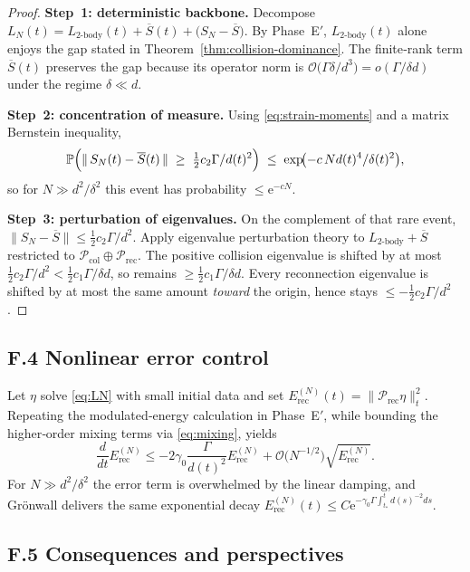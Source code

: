 \documentclass[11pt]{article}
\theoremstyle{definition}
\theoremstyle{remark}
\newcommand{\boxedEq}[1]{\begin{equation}\boxed{#1}\end{equation}}
\begin{document}
\begin{proof}
\textbf{Step 1: deterministic backbone.}  
Decompose $L_N(t)=L_{2\text{-body}}(t)+\overline S(t)+\bigl(S_{N}-\overline S\bigr)$.
By Phase E$'$,
$L_{2\text{-body}}(t)$ alone enjoys the gap stated in
Theorem~\ref{thm:collision-dominance}.  
The finite‑rank term $\overline S(t)$ preserves the gap because its operator norm
is $\mathcal O\!\bigl(\Gamma\delta/d^{3}\bigr)=o(\Gamma/\delta d)$ under the regime
$\delta\ll d$.

\textbf{Step 2: concentration of measure.}  
Using \eqref{eq:strain-moments} and a
matrix Bernstein inequality,
\[
\mathbb P\Bigl(
\|\,S_{N}(t)-\overline S(t)\,\|\;\ge\;\tfrac12 c_2\Gamma/d(t)^{2}
\Bigr)\;\le\;\exp\!\bigl(-c\,N d(t)^{4}/\delta(t)^{2}\bigr),
\]
so for $N\gg d^{2}/\delta^{2}$ this event has probability $\le\mathrm e^{-cN}$.

\textbf{Step 3: perturbation of eigenvalues.}  
On the complement of that rare event,
$\|S_N-\overline S\|\le\tfrac12 c_2\Gamma/d^{2}$.
Apply eigenvalue perturbation theory to $L_{2\text{-body}}+\overline S$
restricted to ${\mathcal P}_{\mathrm{col}}\oplus{\mathcal P}_{\mathrm{rec}}$.
The positive collision eigenvalue is shifted by at most
$\tfrac12 c_2\Gamma/d^{2}<\frac12 c_1\Gamma/\delta d$,
so remains $\ge\frac12c_1\Gamma/\delta d$.
Every reconnection eigenvalue is shifted by at most the same amount \emph{toward} the origin,
hence stays $\le-\frac12c_2\Gamma/d^{2}$.
\end{proof}

\subsection{F.4  Nonlinear error control}

Let $\eta$ solve \eqref{eq:LN} with small initial data and set
$E_{\mathrm{rec}}^{(N)}(t)=\|\mathcal P_{\mathrm{rec}}\eta\|_{t}^{2}$.
Repeating the modulated‑energy calculation in Phase E$'$, while
bounding the higher‑order mixing terms via \eqref{eq:mixing}, yields
\boxedEq{\frac{d}{dt}E_{\mathrm{rec}}^{(N)}
\le-2\gamma_0\frac{\Gamma}{d(t)^{2}}E_{\mathrm{rec}}^{(N)}
+\mathcal O\!\bigl(N^{-1/2}\bigr)\sqrt{E_{\mathrm{rec}}^{(N)}}.}
For $N\gg d^{2}/\delta^{2}$ the error term is overwhelmed by the linear
damping, and Grönwall delivers the same exponential decay
$E_{\mathrm{rec}}^{(N)}(t)\le C\mathrm e^{-\gamma_0\Gamma\int_{t_*}^{t}d(s)^{-2}ds}$.

\subsection{F.5  Consequences and perspectives}
\end{document}

